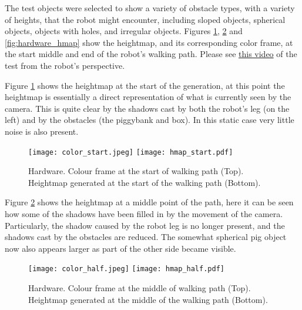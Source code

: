         \noindent
        The test objects were selected to show a variety of obstacle types, with a variety of heights, that the robot might encounter, including sloped objects, spherical objects, objects with holes, and irregular objects.
        Figures \ref{fig:hardware_hmap_start}, \ref{fig:hardware_hmap_mid} and \ref{fig:hardware_hmap} show the heightmap, and its corresponding color frame, at the start middle and end of the robot's walking path. Please see \href{https://youtu.be/AWgku4sVu5w}{this video} of the test from the robot's perspective.
        
        \newpage
        \noindent
        Figure \ref{fig:hardware_hmap_start} shows the heightmap at the start of the generation, at this point the heightmap is essentially a direct representation of what is currently seen by the camera. This is quite clear by the shadows cast by both the robot's leg (on the left) and by the obstacles (the piggybank and box). In this static case
        very little noise is also present.
        \begin{figure}[h]
            \centering
            \hspace{-0.8cm}
            \texttt{[image: color\_start.jpeg]}
            \texttt{[image: hmap\_start.pdf]}
            \caption{Hardware. Colour frame at the start of walking path (Top). Heightmap generated at the start of the walking path (Bottom).}
            \label{fig:hardware_hmap_start}
        \end{figure}
        
        \newpage
        \noindent
        Figure \ref{fig:hardware_hmap_mid} shows the heightmap at a middle point of the path, here it can be seen how some of the shadows have been
        filled in by the movement of the camera. Particularly, the shadow caused by the robot leg is no longer present, and the shadows cast by the
        obstacles are reduced. The somewhat spherical pig object now also appears larger as part of the other side became visible.
        \begin{figure}[h]
            \centering
            \hspace{-0.8cm}
            \texttt{[image: color\_half.jpeg]}
            \texttt{[image: hmap\_half.pdf]}
            \caption{Hardware. Colour frame at the middle of walking path (Top). Heightmap generated at the middle of the walking path (Bottom).}
            \label{fig:hardware_hmap_mid}
        \end{figure}

